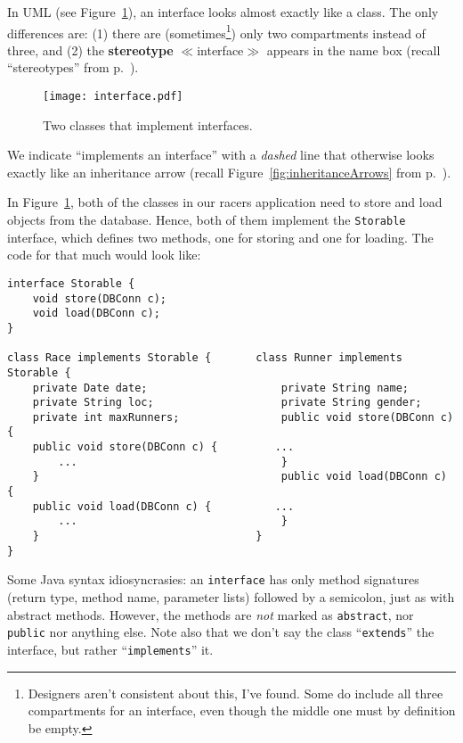 In UML (see Figure~\ref{fig:interface}), an interface looks almost exactly
like a class. The only differences are: (1) there are
(sometimes\footnote{Designers aren't consistent about this, I've found. Some
do include all three compartments for an interface, even though the middle one
must by definition be empty.}) only two compartments instead of three, and (2)
the \textbf{stereotype} $\ll$interface$\gg$ appears in the name box (recall
``stereotypes'' from p.~\pageref{stereotype}).

\begin{figure}[ht]
\centering
\texttt{[image: interface.pdf]}
\caption{Two classes that implement interfaces.}
\label{fig:interface}
\end{figure}

We indicate ``implements an interface'' with a \textit{dashed} line that
otherwise looks exactly like an inheritance arrow (recall
Figure~\ref{fig:inheritanceArrows} from p.~\pageref{page:inheritanceArrows}).

In Figure~\ref{fig:interface}, both of the classes in our racers 
application need to store and load objects from the database. Hence, both of
them implement the \texttt{Storable} interface, which defines two methods, one
for storing and one for loading. The code for that much would look like:

\begin{Verbatim}[fontsize=\scriptsize,samepage=true,frame=single]
interface Storable {
    void store(DBConn c);
    void load(DBConn c);
}

class Race implements Storable {       class Runner implements Storable {                        
    private Date date;                     private String name;
    private String loc;                    private String gender;
    private int maxRunners;                public void store(DBConn c) {
    public void store(DBConn c) {         ...
        ...                                }
    }                                      public void load(DBConn c) {
    public void load(DBConn c) {          ...
        ...                                }
    }                                  }                                          
}                                       
\end{Verbatim}

Some Java syntax idiosyncrasies: an \texttt{interface} has only method
signatures (return type, method name, parameter lists) followed by a
semicolon, just as with abstract methods. However, the methods are
\textit{not} marked as \texttt{abstract}, nor \texttt{public} nor anything
else. Note also that we don't say the class ``\texttt{extends}'' the interface,
but rather ``\texttt{implements}'' it.

